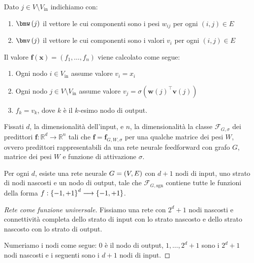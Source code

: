 \documentclass[\main/main.tex]{subfiles}
\begin{document}
\begin{multicols}{2}
\begin{observation}
    Dato \(j \in V \setminus V_{\text{in}}\) indichiamo con:
    \begin{enumerate}
        \item \(\bmw\rnd{j}\) il vettore le cui componenti sono i pesi \(w_{ij}\) per ogni \((i, j) \in E\)
        \item \(\bmv\rnd{j}\) il vettore le cui componenti sono i valori \(v_i\) per ogni \((i, j) \in E\)
    \end{enumerate}
    
    Il valore \(\boldsymbol{f}(\boldsymbol{x})=\left(f_{1}, \ldots, f_{n}\right)\) viene calcolato come segue:
    \begin{enumerate}
        \item Ogni nodo \(i \in V_{\text{in}}\) assume valore \(v_i = x_i\)
        \item Ogni nodo \(j \in V \setminus V_{\text{in}}\) assume valore \(v_{j}=\sigma\left(\boldsymbol{w}(j)^{\top} \boldsymbol{v}(j)\right)\)
        \item \(f_k = v_k\), dove \(k\) è il \(k\)-esimo nodo di output.
    \end{enumerate}
\end{observation}
\begin{definition}
    Fissati \(d\), la dimensionalità dell'input, e \(n\), la dimensionalità la classe \(\mathcal{F}_{G, \sigma}\) dei predittori \(\boldsymbol{f} : \mathbb{R}^{d} \rightarrow \mathbb{R}^{n}\) tali che \(\boldsymbol{f}=\boldsymbol{f}_{G, W, \sigma}\) per una qualche matrice dei pesi \(W\), ovvero predittori rappresentabili da una rete neurale feedforward con grafo \(G\), matrice dei pesi \(W\) e funzione di attivazione \(\sigma\).
\end{definition}
\begin{theorem}
    Per ogni \(d\), esiste una rete neurale \(G=\left(V,E\right)\) con \(d+1\) nodi di input, uno strato di nodi nascosti e un nodo di output, tale che \(\mathcal{F}_{G, \mathrm{sgn}}\) contiene tutte le funzioni della forma \(f:\left\{-1,+1\right\}^d\longrightarrow \left\{-1,+1\right\}\).
\end{theorem}
\begin{proof}[Rete come funzione universale]
    Fissiamo una rete con \(2^d+1\) nodi nascosti e connettività completa dello strato di input con lo strato nascosto e dello strato nascosto con lo strato di output.
    
    Numeriamo i nodi come segue: \(0\) è il nodo di output, \(1, \ldots, 2^d+1\) sono i \(2^d+1\) nodi nascosti e i seguenti sono i \(d+1\) nodi di input.
    

\end{proof}
\end{multicols}
\end{document}
